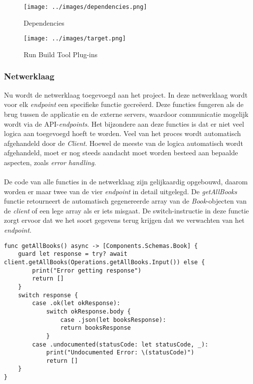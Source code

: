 \begin{figure}[htbp]
    \centering
    \texttt{[image: ../images/dependencies.png]}
    \caption{Dependencies}
    
\end{figure}
\begin{figure}[htbp]
    \centering
    \texttt{[image: ../images/target.png]}
    \caption{Run Build Tool Plug-ins}
    
\end{figure}



\subsubsection{Netwerklaag}
Nu wordt de netwerklaag toegevoegd aan het project. In deze netwerklaag wordt voor elk \textit{endpoint} een specifieke functie gecreëerd. Deze functies fungeren als de brug tussen de applicatie en de externe servers, waardoor communicatie mogelijk wordt via de API-\textit{endpoints}. Het bijzondere aan deze functies is dat er niet veel logica aan toegevoegd hoeft te worden. Veel van het proces wordt automatisch afgehandeld door de \textit{Client}. 
Hoewel de meeste van de logica automatisch wordt afgehandeld, moet er nog steeds aandacht moet worden besteed aan bepaalde aspecten, zoals \textit{error handling}. 
 \\ \\
De code van alle functies in de netwerklaag zijn gelijkaardig opgebouwd, daarom worden er maar twee van de vier \textit{endpoint} in detail uitgelegd. De \textit{getAllBooks} functie retourneert de automatisch gegenereerde array van de \textit{Book}-objecten van de \textit{client} of een lege array als er iets misgaat. De switch-instructie in deze functie zorgt ervoor dat we het soort gegevens terug krijgen dat we verwachten van het \textit{endpoint}. 
\begin{lstlisting}[caption=ApiService file - getAllBooks]
func getAllBooks() async -> [Components.Schemas.Book] {
    guard let response = try? await client.getAllBooks(Operations.getAllBooks.Input()) else {
        print("Error getting response")
        return []
    }
    switch response {
        case .ok(let okResponse):
            switch okResponse.body {
                case .json(let booksResponse):
                return booksResponse
            }
        case .undocumented(statusCode: let statusCode, _):
            print("Undocumented Error: \(statusCode)")
            return []
    }
}
\end{lstlisting}
